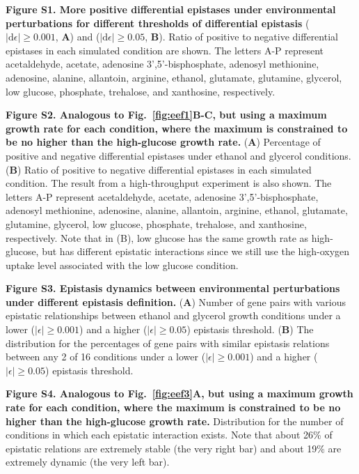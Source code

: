 \documentclass[10pt]{article}
\newcommand\D{\mathrm{d}}
\newcommand{\Fig}{Fig.}
\begin{document}
\begin{description}
\item {\bf Figure S1. More positive differential epistases under environmental perturbations
for different thresholds of differential epistasis}
($\left|\D\epsilon\right| \geq 0.001$, \textbf{A}) and
($\left|\D\epsilon\right| \geq 0.05$, \textbf{B}). Ratio of positive
to negative differential epistases in each simulated condition are
shown. The letters A-P represent acetaldehyde, acetate, adenosine
3',5'-bisphosphate, adenosyl methionine, adenosine, alanine,
allantoin, arginine, ethanol, glutamate, glutamine, glycerol, low
glucose, phosphate, trehalose, and xanthosine, respectively.

\item {\bf Figure S2. Analogous to \Fig~\ref{fig:eef1}B-C, but using a
maximum growth rate for each condition, where the maximum is
constrained to be no higher than the high-glucose growth rate.}
(\textbf{A}) Percentage of positive and negative differential
epistases under ethanol and glycerol conditions. (\textbf{B}) Ratio of
positive to negative differential epistases in each simulated
condition. The result from a high-throughput experiment is also
shown. The letters A-P represent acetaldehyde, acetate, adenosine
3',5'-bisphosphate, adenosyl methionine, adenosine, alanine,
allantoin, arginine, ethanol, glutamate, glutamine, glycerol, low
glucose, phosphate, trehalose, and xanthosine, respectively. Note that
in (B), low glucose has the same growth rate as high-glucose, but has
different epistatic interactions since we still use the high-oxygen
uptake level associated with the low glucose condition.

\item {\bf Figure S3. Epistasis dynamics between environmental
perturbations under different epistasis definition.} (\textbf{A})
Number of gene pairs with various epistatic relationships between
ethanol and glycerol growth conditions under a lower
($\left|\epsilon\right| \geq 0.001$) and a higher
($\left|\epsilon\right| \geq 0.05$) epistasis threshold. (\textbf{B})
The distribution for the percentages of gene pairs with similar
epistasis relations between any 2 of 16 conditions under a lower
($\left|\epsilon\right| \geq 0.001$) and a higher
($\left|\epsilon\right| \geq 0.05$) epistasis threshold.

\item {\bf Figure S4. Analogous to \Fig~\ref{fig:eef3}A, but using a
maximum growth rate for each condition, where the maximum is
constrained to be no higher than the high-glucose growth rate.}
Distribution for the number of conditions in which each epistatic
interaction exists. Note that about 26\% of epistatic relations are
extremely stable (the very right bar) and about 19\% are extremely
dynamic (the very left bar). 


\end{description}
\end{document}
